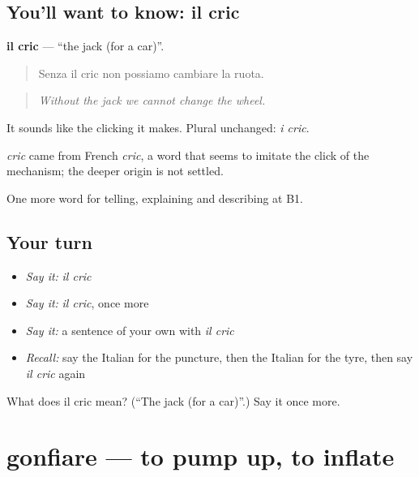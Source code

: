 \subsection*{You'll want to know: il cric}
\textbf{il cric} — \textquotedblleft{}the jack (for a car)\textquotedblright{}.

\begin{quote}
Senza il cric non possiamo cambiare la ruota.
\end{quote}

\begin{quote}
\emph{Without the jack we cannot change the wheel.}
\end{quote}

It sounds like the clicking it makes. Plural unchanged: \emph{i cric}.

\begin{cousinweb}
\emph{cric} came from French \emph{cric}, a word that seems to imitate the click of the mechanism; the deeper origin is not settled.
\end{cousinweb}

\begin{grammarlens}[title={What you've built}]
One more word for telling, explaining and describing at B1.
\end{grammarlens}

\subsection*{Your turn}
\begin{itemize}
\raggedright
  \item \emph{Say it:} \emph{il cric}
  \item \emph{Say it:} \emph{il cric}, once more
  \item \emph{Say it:} a sentence of your own with \emph{il cric}
  \item \emph{Recall:} say the Italian for the puncture, then the Italian for the tyre, then say \emph{il cric} again
\end{itemize}

\begin{tcolorbox}[breakable,colback=teal!4,colframe=teal!35!black,title={Before you move on}]
What does il cric mean? (\textquotedblleft{}The jack (for a car)\textquotedblright{}.) Say it once more.
\end{tcolorbox}
\section[gonfiare]{gonfiare — to pump up, to inflate}

